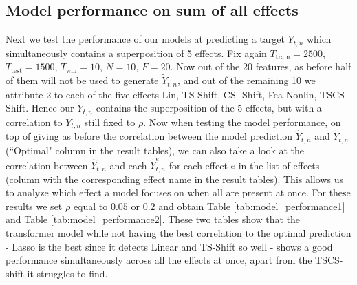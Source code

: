 \documentclass{article}
\begin{document}
\subsection{Model performance on sum of all effects}

Next we test the performance of our models at predicting a target $Y_{t,n}$ which simultaneously contains a superposition of 5 effects. Fix again $T_{\text{train}} = 2500$, $T_{\text{test}} = 1500$, $T_{\text{win}} = 10$, $N = 10$, $F = 20$. Now out of the 20 features, as before half of them will not be used to generate $\widetilde Y_{t,n}$, and out of the remaining 10 we attribute 2 to each of the five effects Lin, TS-Shift, CS-
Shift, Fea-Nonlin, TSCS-Shift. Hence our $\widetilde Y_{t,n}$ contains the superposition of the 5 effects, but with a correlation to $Y_{t,n}$ still fixed to $\rho$. Now when testing the model performance, on top of giving as before the correlation between the model prediction $\widehat Y_{t,n}$ and $\widetilde Y_{t,n}$ (``Optimal" column in the result tables), we can also take a look at the correlation between $\widehat Y_{t,n}$ and each $\widetilde Y_{t,n}^e$ for each effect $e$ in the list of effects (column with the corresponding effect name in the result tables). This allows us to analyze which effect a model focuses on when all are present at once. For these results we set $\rho$ equal to $0.05$ or $0.2$ and obtain Table \ref{tab:model_performance1} and Table \ref{tab:model_performance2}. These two tables show that the transformer model while not having the best correlation to the optimal prediction - Lasso is the best since it detects Linear and TS-Shift so well - shows a good performance simultaneously across all the effects at once, apart from the TSCS-shift it struggles to find.
\end{document}
